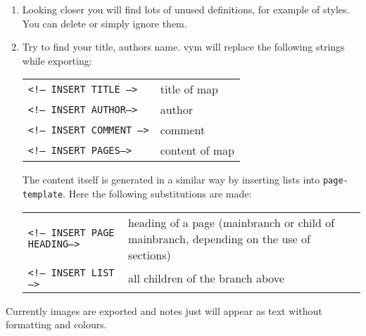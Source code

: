 \documentclass[12pt,a4paper]{article}
\newcommand{\vym}{{\sc vym }}
\begin{document}
\begin{appendix}
\begin{enumerate}
    \item Looking closer you will find lots of unused definitions, for
    example of styles. You can delete or simply ignore them.

    \item Try to find your title, authors name. \vym will replace the
    following strings while exporting:
    \begin{center}
    \begin{tabular}{lp{4cm}}
        {\tt <!-- INSERT TITLE -->}     & title of map \\
        {\tt <!-- INSERT AUTHOR-->  }   & author \\
        {\tt <!-- INSERT COMMENT -->}   & comment \\
        {\tt <!-- INSERT PAGES-->}      & content of map \\
    \end{tabular}
    \end{center}
    The content itself is generated in a similar way by inserting lists
    into {\tt page-template}. Here the following substitutions are made:
    \begin{center}
    \begin{tabular}{lp{7cm}}
        {\tt <!-- INSERT PAGE HEADING-->}       & heading of a page
        (mainbranch or child of mainbranch, depending on the use of
        sections) \\
        {\tt <!-- INSERT LIST -->   }   & all children of the branch above \\
    \end{tabular}
    \end{center}
\end{enumerate}
Currently images are exported and notes just will appear as text
without formatting and colours.


\end{appendix}
\end{document}
